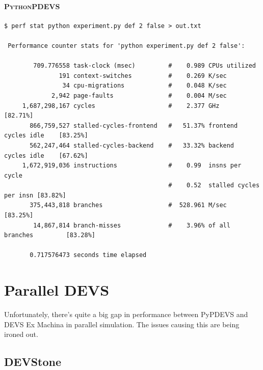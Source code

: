 \documentclass[8pt,a4paper]{report}
\begin{document}
\paragraph{\textsc{PythonPDEVS}}
\begin{Verbatim}[fontsize=\small]
$ perf stat python experiment.py def 2 false > out.txt

 Performance counter stats for 'python experiment.py def 2 false':

        709.776558 task-clock (msec)         #    0.989 CPUs utilized          
               191 context-switches          #    0.269 K/sec                  
                34 cpu-migrations            #    0.048 K/sec                  
             2,942 page-faults               #    0.004 M/sec                  
     1,687,298,167 cycles                    #    2.377 GHz                     [82.71%]
       866,759,527 stalled-cycles-frontend   #   51.37% frontend cycles idle    [83.25%]
       562,247,464 stalled-cycles-backend    #   33.32% backend  cycles idle    [67.62%]
     1,672,919,036 instructions              #    0.99  insns per cycle        
                                             #    0.52  stalled cycles per insn [83.82%]
       375,443,818 branches                  #  528.961 M/sec                   [83.25%]
        14,867,814 branch-misses             #    3.96% of all branches         [83.28%]

       0.717576473 seconds time elapsed
\end{Verbatim}

\section{Parallel DEVS}
Unfortunately, there's quite a big gap in performance between PyPDEVS and DEVS Ex Machina in parallel simulation. The issues causing this are being ironed out.

\subsection{DEVStone}
\end{document}

